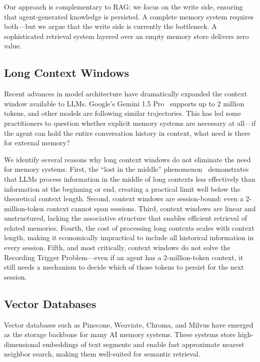 \documentclass[11pt]{article}
\begin{document}
Our approach is complementary to RAG: we focus on the write side, ensuring that agent-generated knowledge is persisted. A complete memory system requires both---but we argue that the write side is currently the bottleneck. A sophisticated retrieval system layered over an empty memory store delivers zero value.

\subsection{Long Context Windows}

Recent advances in model architecture have dramatically expanded the context window available to LLMs. Google's Gemini 1.5 Pro~\cite{google2024gemini} supports up to 2 million tokens, and other models are following similar trajectories. This has led some practitioners to question whether explicit memory systems are necessary at all---if the agent can hold the entire conversation history in context, what need is there for external memory?

We identify several reasons why long context windows do not eliminate the need for memory systems. First, the ``lost in the middle'' phenomenon~\cite{liu2024lost} demonstrates that LLMs process information in the middle of long contexts less effectively than information at the beginning or end, creating a practical limit well below the theoretical context length. Second, context windows are session-bound: even a 2-million-token context cannot span sessions. Third, context windows are linear and unstructured, lacking the associative structure that enables efficient retrieval of related memories. Fourth, the cost of processing long contexts scales with context length, making it economically impractical to include all historical information in every session. Fifth, and most critically, context windows do not solve the Recording Trigger Problem---even if an agent has a 2-million-token context, it still needs a mechanism to decide which of those tokens to persist for the next session.

\subsection{Vector Databases}

Vector databases such as Pinecone, Weaviate, Chroma, and Milvus have emerged as the storage backbone for many AI memory systems. These systems store high-dimensional embeddings of text segments and enable fast approximate nearest neighbor search, making them well-suited for semantic retrieval.
\end{document}

